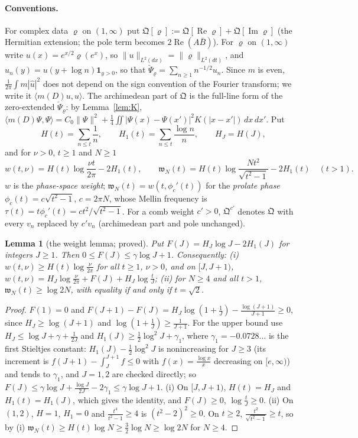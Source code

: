 \documentclass[11pt]{amsart}
\newtheorem{lemma}[theorem]{Lemma}
\theoremstyle{definition}
\theoremstyle{remark}
\newcommand{\Rel}{\operatorname{Re}}
\newcommand{\Iml}{\operatorname{Im}}
\begin{document}
\paragraph{Conventions.} For complex data $\varrho$ on $(1,\infty)$ put $\mathfrak Q[\varrho]:=\mathfrak Q[\Rel\varrho]+\mathfrak Q[\Iml\varrho]$
(the Hermitian extension; the pole term becomes $2\Rel(A\bar B)$). For $\varrho$ on $(1,\infty)$ write
$u(x)=e^{x/2}\varrho(e^x)$, so $\|u\|_{L^2(dx)}=\|\varrho\|_{L^2(dt)}$, and $u_n(y)=u(y+\log n)\mathbf 1_{y>0}$, so that
$\check\Psi_\varrho=\sum_{n\ge1}n^{-1/2}u_n$. Since $m$ is even, $\frac1{2\pi}\int m|\widehat u|^2$ does not depend on the sign
convention of the Fourier transform; we write it $\langle m(D)u,u\rangle$. The archimedean part of $\mathfrak Q$ is the
full-line form of the zero-extended $\check\Psi_\varrho$: by Lemma~\ref{lem:K}, $\langle m(D)\Psi,\Psi\rangle
=C_0\|\Psi\|^2+\frac14\iint|\Psi(x)-\Psi(x')|^2K(|x-x'|)\,dx\,dx'$. Put
\[
H(t)=\sum_{n\le t}\frac1n,\qquad H_1(t)=\sum_{n\le t}\frac{\log n}n,\qquad H_J=H(J),
\]
and for $\nu>0$, $t\ge1$ and $N\ge1$
\[
w(t,\nu)=H(t)\log\frac{\nu t}{2\pi}-2H_1(t),\qquad
\mathfrak w_N(t)=H(t)\log\frac{Nt^2}{\sqrt{t^2-1}}-2H_1(t)\quad(t>1).
\]
$w$ is the \emph{phase-space weight}; $\mathfrak w_N(t)=w(t,\phi_c'(t))$ for the \emph{prolate phase}
$\phi_c(t)=c\sqrt{t^2-1}$, $c=2\pi N$, whose Mellin frequency is $\tau(t)=t\phi_c'(t)=ct^2/\sqrt{t^2-1}$. For a comb weight
$c'>0$, $\mathfrak Q^{c'}$ denotes $\mathfrak Q$ with every $v_n$ replaced by $c'v_n$ (archimedean part and pole unchanged).

\begin{lemma}[the weight lemma; proved]\label{lem:ext-weight}
Put $F(J)=H_J\log J-2H_1(J)$ for integers $J\ge1$. Then $0\le F(J)\le\gamma\log J+1$. Consequently:
\emph{(i)} $w(t,\nu)\ge H(t)\log\frac\nu{2\pi}$ for all $t\ge1$, $\nu>0$, and on $[J,J+1)$,
$w(t,\nu)=H_J\log\frac\nu{2\pi}+F(J)+H_J\log\frac tJ$;
\emph{(ii)} for $N\ge4$ and all $t>1$, $\mathfrak w_N(t)\ge\log2N$, with equality if and only if $t=\sqrt2$.
\end{lemma}
\begin{proof}
$F(1)=0$ and $F(J+1)-F(J)=H_J\log(1+\frac1J)-\frac{\log(J+1)}{J+1}\ge0$, since $H_J\ge\log(J+1)$ and
$\log(1+\frac1J)\ge\frac1{J+1}$. For the upper bound use $H_J\le\log J+\gamma+\frac1{2J}$ and $H_1(J)\ge\frac12\log^2J+\gamma_1$, where
$\gamma_1=-0.0728\ldots$ is the first Stieltjes constant: $H_1(J)-\frac12\log^2J$ is nonincreasing for $J\ge3$ (its increment is
$f(J+1)-\int_J^{J+1}f\le0$ with $f(x)=\frac{\log x}x$ decreasing on $[e,\infty)$) and tends to $\gamma_1$, and $J=1,2$ are checked
directly; so $F(J)\le\gamma\log J+\frac{\log J}{2J}-2\gamma_1\le\gamma\log J+1$. (i) On $[J,J+1)$, $H(t)=H_J$ and $H_1(t)=H_1(J)$,
which gives the identity, and $F(J)\ge0$, $\log\frac tJ\ge0$. (ii) On $(1,2)$, $H=1$, $H_1=0$ and $\frac{t^4}{t^2-1}\ge4$ is
$(t^2-2)^2\ge0$. On $t\ge2$, $\frac{t^2}{\sqrt{t^2-1}}\ge t$, so by (i) $\mathfrak w_N(t)\ge H(t)\log N\ge\frac32\log N\ge\log2N$ for
$N\ge4$.
\end{proof}
\end{document}
